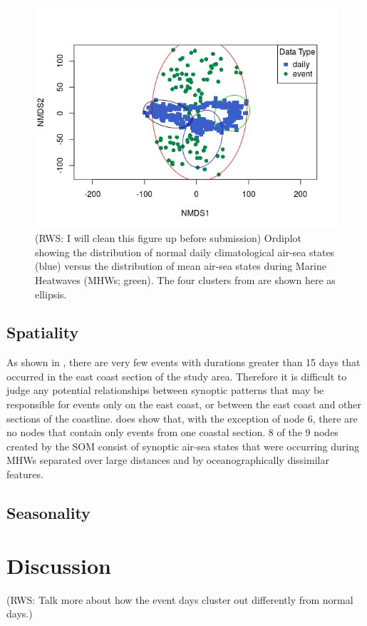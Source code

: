 \documentclass[a4paper,10pt,review]{elsarticle}
\begin{document}
\begin{figure}
\includegraphics[width=1.0\textwidth]{figure_7.jpeg}
\caption{(RWS: I will clean this figure up before submission) Ordiplot showing the distribution of normal daily climatological air-sea states (blue) versus the distribution of mean air-sea states during Marine Heatwaves (MHWs; green). The four clusters from  are shown here as ellipsis.}
\label{figure7}
\end{figure}

\subsection{Spatiality}
As shown in , there are very few events with durations greater than 15 days that occurred in the east coast section of the study area. Therefore it is difficult to judge any potential relationships between synoptic patterns that may be responsible for events only on the east coast, or between the east coast and other sections of the coastline.  does show that, with the exception of node 6, there are no nodes that contain only events from one coastal section. 8 of the 9 nodes created by the SOM consist of synoptic air-sea states that were occurring during MHWs separated over large distances and by oceanographically dissimilar features.

\subsection{Seasonality}

\section{Discussion}
(RWS: Talk more about how the event days cluster out differently from normal days.)
\end{document}
